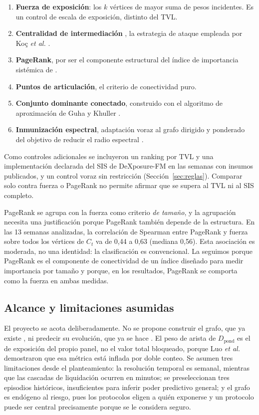\documentclass[journal]{IEEEtran}
\begin{document}
\begin{enumerate}
\item \textbf{Fuerza de exposición}: los $k$ vértices de mayor suma de pesos
      incidentes. Es un control de escala de exposición, distinto del TVL.
\item \textbf{Centralidad de intermediación} \cite{freeman1977betweenness}, la
      estrategia de ataque empleada por Koç \emph{et al.}
      \cite{koc2014topological}.
\item \textbf{PageRank}, por ser el componente estructural del índice de
      importancia sistémica de \cite{shu2026dexposurefm}.
\item \textbf{Puntos de articulación}, el criterio de conectividad puro.
\item \textbf{Conjunto dominante conectado}, construido con el algoritmo de
      aproximación de Guha y Khuller \cite{guha1998approximation}.
\item \textbf{Inmunización espectral}, adaptación voraz al grafo dirigido y
      ponderado del objetivo de reducir el radio espectral \cite{chen2016node}.
\end{enumerate}

Como controles adicionales se incluyeron un ranking por TVL y una
implementación declarada del SIS de DeXposure-FM \cite{shu2026dexposurefm} en
las semanas con insumos publicados, y un control voraz sin restricción
(Sección~\ref{sec:reglas}). Comparar solo contra fuerza o PageRank no permite
afirmar que se supera al TVL ni al SIS completo.

PageRank se agrupa con la fuerza como criterio \emph{de tamaño}, y la
agrupación necesita una justificación porque PageRank también depende de la
estructura. En las 13 semanas analizadas, la correlación de Spearman entre
PageRank y fuerza sobre todos los vértices de $C_t$ va de 0{,}44 a 0{,}63
(mediana 0{,}56). Esta asociación es moderada, no una identidad: la
clasificación es convencional. La seguimos porque PageRank es el componente de
conectividad de un índice diseñado para medir importancia por tamaño
\cite{shu2026dexposurefm} y porque, en los resultados, PageRank se comporta
como la fuerza en ambas medidas.

\subsection{Alcance y limitaciones asumidas}

El proyecto se acota deliberadamente. No se propone construir el grafo, que ya
existe \cite{wu2025dexposure}, ni predecir su evolución, que ya se hace
\cite{shu2026dexposurefm}. El peso de arista de
$D_{\text{pond}}$ es el de exposición del propio panel, no el valor total
bloqueado, porque Luo \emph{et al.} \cite{luo2024piercing} demostraron que esa
métrica está inflada por doble conteo. Se asumen tres limitaciones desde el
planteamiento: la resolución temporal es semanal, mientras que las cascadas de
liquidación ocurren en minutos; se preseleccionan tres episodios históricos,
insuficientes para inferir poder predictivo general; y el grafo es endógeno al riesgo, pues los protocolos
eligen a quién exponerse y un protocolo puede ser central precisamente porque se
le considera seguro.
\end{document}

